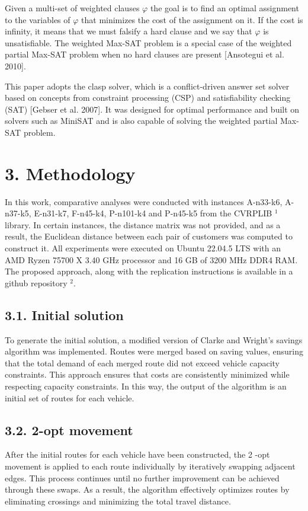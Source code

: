 \documentclass[10pt]{article}
\begin{document}
Given a multi-set of weighted clauses $\varphi$ the goal is to find an optimal assignment to the variables of $\varphi$ that minimizes the cost of the assignment on it. If the cost is infinity, it means that we must falsify a hard clause and we say that $\varphi$ is unsatisfiable. The weighted Max-SAT problem is a special case of the weighted partial Max-SAT problem when no hard clauses are present [Ansotegui et al. 2010].

This paper adopts the clasp solver, which is a conflict-driven answer set solver based on concepts from constraint processing (CSP) and satisfiability checking (SAT) [Gebser et al. 2007]. It was designed for optimal performance and built on solvers such as MiniSAT and is also capable of solving the weighted partial Max-SAT problem.

\section*{3. Methodology}
In this work, comparative analyses were conducted with instances A-n33-k6, A-n37-k5, E-n31-k7, F-n45-k4, P-n101-k4 and P-n45-k5 from the CVRPLIB ${ }^{1}$ library. In certain instances, the distance matrix was not provided, and as a result, the Euclidean distance between each pair of customers was computed to construct it. All experiments were executed on Ubuntu 22.04.5 LTS with an AMD Ryzen 75700 X 3.40 GHz processor and 16 GB of 3200 MHz DDR4 RAM. The proposed approach, along with the replication instructions is available in a github repository ${ }^{2}$.

\subsection*{3.1. Initial solution}
To generate the initial solution, a modified version of Clarke and Wright's savings algorithm was implemented. Routes were merged based on saving values, ensuring that the total demand of each merged route did not exceed vehicle capacity constraints. This approach ensures that costs are consistently minimized while respecting capacity constraints. In this way, the output of the algorithm is an initial set of routes for each vehicle.

\subsection*{3.2. 2-opt movement}
After the initial routes for each vehicle have been constructed, the 2 -opt movement is applied to each route individually by iteratively swapping adjacent edges. This process continues until no further improvement can be achieved through these swaps. As a result, the algorithm effectively optimizes routes by eliminating crossings and minimizing the total travel distance.
\end{document}
